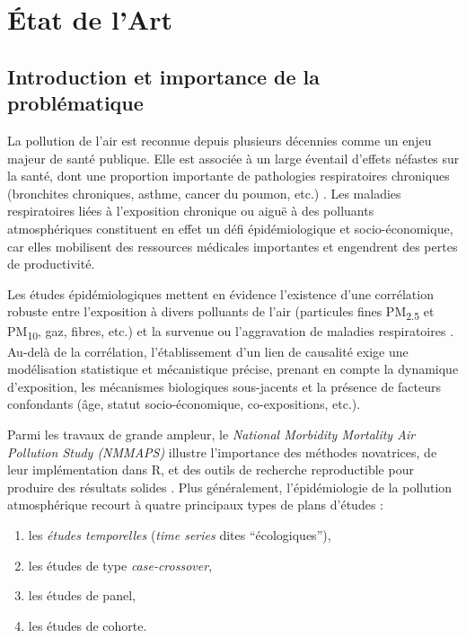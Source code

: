 \chapter{\'Etat de l'Art}
\label{ch:stateart}

\section{Introduction et importance de la problématique}
La pollution de l'air est reconnue depuis plusieurs décennies comme un enjeu majeur de santé publique. Elle est associée à un large éventail d'effets néfastes sur la santé, dont une proportion importante de pathologies respiratoires chroniques (bronchites chroniques, asthme, cancer du poumon, etc.) \citep{Bang2015,Donaldson2010,Mazurek2017}. Les maladies respiratoires liées à l'exposition chronique ou aiguë à des polluants atmosphériques constituent en effet un défi épidémiologique et socio-économique, car elles mobilisent des ressources médicales importantes et engendrent des pertes de productivité.

Les études épidémiologiques mettent en évidence l'existence d'une corrélation robuste entre l'exposition à divers polluants de l'air (particules fines PM\textsubscript{2.5} et PM\textsubscript{10}, gaz, fibres, etc.) et la survenue ou l'aggravation de maladies respiratoires \citep{Cho2011,Gomes2014}. Au-delà de la corrélation, l'établissement d'un lien de causalité exige une modélisation statistique et mécanistique précise, prenant en compte la dynamique d'exposition, les mécanismes biologiques sous-jacents et la présence de facteurs confondants (âge, statut socio-économique, co-expositions, etc.).

Parmi les travaux de grande ampleur, le \emph{National Morbidity Mortality Air Pollution Study (NMMAPS)} illustre l'importance des méthodes novatrices, de leur implémentation dans \textsf{R}, et des outils de recherche reproductible pour produire des résultats solides \citep{DominiciMcDermottDaniels2003,SametDominiciZeger2000,SametZegerDominici2000,SametDominiciCurriero2000,DominiciSametZeger2000,BellMcDermottZeger2004,PengDominiciPastorBarriuso2005,DominiciPengZeger2007}. Plus généralement, l'épidémiologie de la pollution atmosphérique recourt à quatre principaux types de plans d'études : 

\begin{enumerate}
\item les \emph{études temporelles} (\emph{time series} dites ``écologiques''),
\item les études de type \emph{case-crossover},
\item les études de panel,
\item les études de cohorte. 
\end{enumerate}

